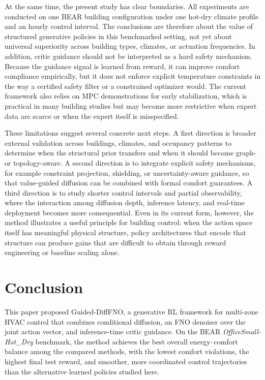 \documentclass[lettersize,journal]{IEEEtran}
\theoremstyle{nonumberplain}     \theoremheaderfont{\bfseries\itshape}     \theorembodyfont{\normalfont}     \theoremseparator{:}     \theoremsymbol{\ensuremath{\blacksquare}}     \newtheorem{proof}{Proof}
\theoremstyle{plain}     \theoremheaderfont{\bfseries\itshape}     \theorembodyfont{\normalfont}     \theoremseparator{:}     \theoremsymbol{\ensuremath{\blacksquare}}     \newtheorem{remark}{Remark}
\begin{document}
At the same time, the present study has clear boundaries. All experiments are conducted on one BEAR building configuration under one hot-dry climate profile and an hourly control interval. The conclusions are therefore about the value of structured generative policies in this benchmarked setting, not yet about universal superiority across building types, climates, or actuation frequencies. In addition, critic guidance should not be interpreted as a hard safety mechanism. Because the guidance signal is learned from reward, it can improve comfort compliance empirically, but it does not enforce explicit temperature constraints in the way a certified safety filter or a constrained optimizer would. The current framework also relies on MPC demonstrations for early stabilization, which is practical in many building studies but may become more restrictive when expert data are scarce or when the expert itself is misspecified.

These limitations suggest several concrete next steps. A first direction is broader external validation across buildings, climates, and occupancy patterns to determine when the structural prior transfers and when it should become graph- or topology-aware. A second direction is to integrate explicit safety mechanisms, for example constraint projection, shielding, or uncertainty-aware guidance, so that value-guided diffusion can be combined with formal comfort guarantees. A third direction is to study shorter control intervals and partial observability, where the interaction among diffusion depth, inference latency, and real-time deployment becomes more consequential. Even in its current form, however, the method illustrates a useful principle for building control: when the action space itself has meaningful physical structure, policy architectures that encode that structure can produce gains that are difficult to obtain through reward engineering or baseline scaling alone.

\section{Conclusion}
\label{sec:conclusion}

This paper proposed Guided-DiffFNO, a generative RL framework for multi-zone HVAC control that combines conditional diffusion, an FNO denoiser over the joint action vector, and inference-time critic guidance. On the BEAR \emph{OfficeSmall-Hot\_Dry} benchmark, the method achieves the best overall energy--comfort balance among the compared methods, with the lowest comfort violations, the highest final test reward, and smoother, more coordinated control trajectories than the alternative learned policies studied here.
\end{document}
